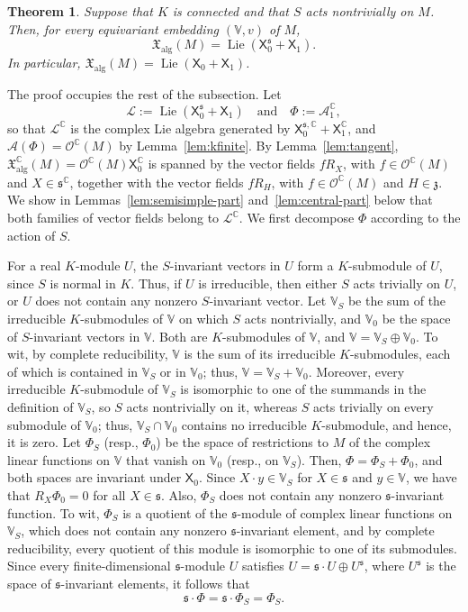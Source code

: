 \documentclass{article}
\newcommand{\C}{\mathbb{C}}
\newcommand{\fraks}{\mathfrak{s}}
\newcommand{\frakz}{\mathfrak{z}}
\newcommand{\xalg}{\mathfrak X_{\mathrm{alg}}}
\newcommand{\sX}{\mathsf{X}}
\newcommand{\Ocal}{\mathcal{O}}
\newcommand{\cL}{\mathcal{L}}
\newcommand{\xc}[1]{\vspace{.1cm}
\noindent {\em #1} }
\newtheorem{theorem}{Theorem}
\theoremstyle{definition}
\theoremstyle{plain}
\begin{document}
\begin{theorem}\label{thm:reductive}
Suppose that $K$ is connected and that $S$ acts nontrivially on $M$.  Then, for every equivariant embedding $(\mathbb V,v)$ of $M$,
$$
  \xalg(M)=\operatorname{Lie}(\sX_0^{\fraks}+\sX_1).
$$
In particular, $\xalg(M)=\operatorname{Lie}(\sX_0+\sX_1)$.
\end{theorem}

The proof occupies the rest of the subsection.
Let
$$
    \cL:=\operatorname{Lie}(\sX_0^{\fraks}+\sX_1) \quad\mbox{and}\quad
    \Phi:=\mathcal A_1^\C,
$$
so that $\cL^\C$ is the complex Lie algebra generated by $\sX_0^{\fraks,\C}+\sX_1^\C$, and $\mathcal A(\Phi)=\Ocal^\C(M)$ by Lemma~\ref{lem:kfinite}.
By Lemma~\ref{lem:tangent}, $\xalg^\C(M)=\Ocal^\C(M)\sX_0^\C$ is spanned by the vector fields $fR_X$, with $f\in\Ocal^\C(M)$ and $X\in\fraks^\C$, together with the vector fields $fR_H$, with $f\in\Ocal^\C(M)$ and $H\in\frakz$.
We show in Lemmas~\ref{lem:semisimple-part} and~\ref{lem:central-part} below that both families of vector fields belong to $\cL^\C$.
We first decompose $\Phi$ according to the action of $S$.

\xc{Decomposition of $\Phi$:}
 For a real $K$-module $U$, the $S$-invariant vectors in $U$ form a $K$-submodule of $U$, since $S$ is normal in $K$.
Thus, if $U$ is irreducible, then either $S$ acts trivially on $U$, or $U$ does not contain any nonzero $S$-invariant vector.
Let $\mathbb V_S$ be the sum of the irreducible $K$-submodules of $\mathbb V$ on which $S$ acts nontrivially, and $\mathbb V_0$ be the space of $S$-invariant vectors in $\mathbb V$.
Both are $K$-submodules of $\mathbb V$, and $\mathbb V=\mathbb V_S\oplus\mathbb V_0$.
To wit, by complete reducibility, $\mathbb V$ is the sum of its irreducible $K$-submodules, each of which is contained in $\mathbb V_S$ or in $\mathbb V_0$; thus, $\mathbb V=\mathbb V_S+\mathbb V_0$.
Moreover, every irreducible $K$-submodule of $\mathbb V_S$ is isomorphic to one of the summands in the definition of $\mathbb V_S$, so $S$ acts nontrivially on it, whereas $S$ acts trivially on every submodule of $\mathbb V_0$; thus, $\mathbb V_S\cap\mathbb V_0$ contains no irreducible $K$-submodule, and hence, it is zero.
Let $\Phi_S$ (resp., $\Phi_0$) be the space of restrictions to $M$ of the complex linear functions on $\mathbb V$ that vanish on $\mathbb V_0$ (resp., on $\mathbb V_S$).
Then, $\Phi=\Phi_S+\Phi_0$, and both spaces are invariant under $\sX_0$.
Since $X\cdot y\in \mathbb V_S$ for $X\in\fraks$ and $y\in \mathbb V$, we have that $R_X\Phi_0=0$ for all $X\in\fraks$.
Also, $\Phi_S$ does not contain any nonzero $\fraks$-invariant function. To wit, $\Phi_S$ is a quotient of the $\fraks$-module of complex linear functions on $\mathbb V_S$, which does not contain any nonzero $\fraks$-invariant element, and by complete reducibility, every quotient of this module is isomorphic to one of its submodules.
Since every finite-dimensional $\fraks$-module $U$ satisfies $U=\fraks\cdot U\oplus U^{\fraks}$, where $U^{\fraks}$ is the space of $\fraks$-invariant elements, it follows that
\begin{equation}\label{eq:s-Phi}
\fraks\cdot\Phi=\fraks\cdot\Phi_S=\Phi_S.
\end{equation}
\end{document}
